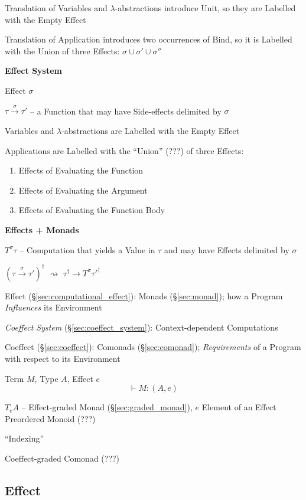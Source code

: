 Translation of Variables and $\lambda$-abstractions introduce Unit, so
they are Labelled with the Empty Effect

Translation of Application introduces two occurrences of Bind, so it
is Labelled with the Union of three Effects: $\sigma \cup \sigma' \cup
\sigma''$ %


\textbf{Effect System}

Effect $\sigma$

$\tau \xrightarrow{\sigma} \tau'$ -- a Function that may have
Side-effects delimited by $\sigma$

Variables and $\lambda$-abstractions are Labelled with the Empty
Effect

Applications are Labelled with the ``Union'' (???) of three Effects:
\begin{enumerate}
  \item Effects of Evaluating the Function
  \item Effects of Evaluating the Argument
  \item Effects of Evaluating the Function Body
\end{enumerate}


\textbf{Effects + Monads}

$T^\sigma\tau$ -- Computation that yields a Value in $\tau$ and may
have Effects delimited by $\sigma$

$(\tau \xrightarrow{\sigma} \tau')^\dag$
$\rightsquigarrow$
$\tau^\dag \rightarrow T^\sigma \tau'^\dag$


\asterism


Effect (\S\ref{sec:computational_effect}): Monads (\S\ref{sec:monad});
how a Program \emph{Influences} its Environment

\emph{Coeffect System} (\S\ref{sec:coeffect_system}):
Context-dependent Computations

Coeffect (\S\ref{sec:coeffect}): Comonads (\S\ref{sec:comonad});
\emph{Requirements} of a Program with respect to its Environment

Term $M$, Type $A$, Effect $e$
\[
  \vdash M :(A,e)
\]

$T_e A$ -- Effect-graded Monad (\S\ref{sec:graded_monad}), $e$ Element
of an Effect Preordered Monoid (???)

``Indexing''

Coeffect-graded Comonad (???)



\subsection{Effect}\label{sec:effect}

